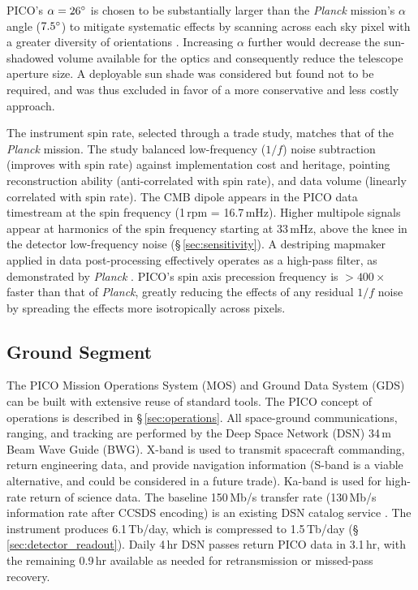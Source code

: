 PICO's $\alpha=26^\circ$ is chosen to be substantially larger than
the \textit{Planck} mission's $\alpha$ angle ($7.5^\circ$) to
mitigate systematic effects by scanning across each sky pixel with a
greater diversity of orientations \citep{Hu2003}. Increasing $\alpha$
further would decrease the sun-shadowed volume available for the
optics and consequently reduce the telescope aperture size. A
deployable sun shade was considered but found not to be required, and
was thus excluded in favor of a more conservative and less costly
approach.

The instrument spin rate, selected through a trade study, matches that
of the \textit{Planck} mission. The study balanced low-frequency
($1/f$) noise subtraction (improves with spin rate) against
implementation cost and heritage, pointing reconstruction ability
(anti-correlated with spin rate), and data volume (linearly correlated
with spin rate).  The CMB dipole appears in the PICO data timestream
at the spin frequency (1\,rpm = 16.7\,mHz). Higher multipole signals
appear at harmonics of the spin frequency starting at 33\,mHz, above
the knee in the detector low-frequency noise
(\S\,\ref{sec:sensitivity}). A destriping mapmaker applied in data
post-processing effectively operates as a high-pass filter, as
demonstrated by \textit{Planck} \citep{Kurki-Suonio2009}. PICO's spin
axis precession frequency is $>400\times$ faster than that of
\textit{Planck}, greatly reducing the effects of any residual $1/f$
noise by spreading the effects more isotropically across pixels.

\subsection{Ground Segment}
\label{sec:ground_segment} %

The PICO Mission Operations System (MOS) and Ground Data System (GDS)
can be built with extensive reuse of standard tools. The PICO concept
of operations is described in \S\,\ref{sec:operations}.
All space-ground communications, ranging, and tracking are performed
by the Deep Space Network (DSN) 34\,m Beam Wave Guide (BWG). X-band is
used to transmit spacecraft commanding, return engineering data, and
provide navigation information (S-band is a viable alternative, and
could be considered in a future trade). Ka-band is used for high-rate
return of science data.  The baseline 150\,Mb/s transfer rate
(130\,Mb/s information rate after CCSDS encoding) is an existing DSN
catalog service \cite{DSN2015}.  The instrument produces 6.1\,Tb/day,
which is compressed to 1.5\,Tb/day
(\S\,\ref{sec:detector_readout}). Daily 4\,hr DSN passes return PICO
data in 3.1\,hr, with the remaining 0.9\,hr available as needed for
retransmission or missed-pass recovery.


